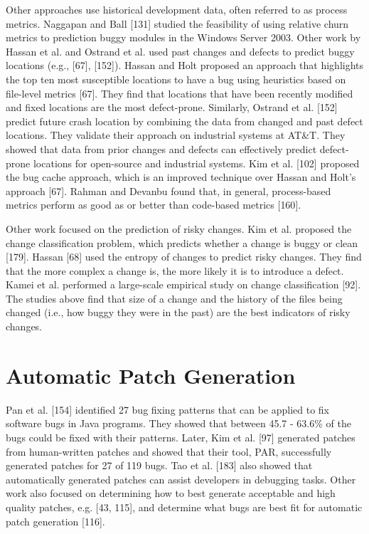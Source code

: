 \documentclass[12pt]{report}
\begin{document}
Other approaches use historical development data, often referred to as
process metrics. Naggapan and Ball {[}131{]} studied the feasibility of
using relative churn metrics to prediction buggy modules in the Windows
Server 2003. Other work by Hassan et al. and Ostrand et al. used past
changes and defects to predict buggy locations (e.g., {[}67{]},
{[}152{]}). Hassan and Holt proposed an approach that highlights the top
ten most susceptible locations to have a bug using heuristics based on
file-level metrics {[}67{]}. They find that locations that have been
recently modified and fixed locations are the most defect-prone.
Similarly, Ostrand et al. {[}152{]} predict future crash location by
combining the data from changed and past defect locations. They validate
their approach on industrial systems at AT\&T. They showed that data
from prior changes and defects can effectively predict defect-prone
locations for open-source and industrial systems. Kim et al. {[}102{]}
proposed the bug cache approach, which is an improved technique over
Hassan and Holt's approach {[}67{]}. Rahman and Devanbu found that, in
general, process-based metrics perform as good as or better than
code-based metrics {[}160{]}.

Other work focused on the prediction of risky changes. Kim et al.
proposed the change classification problem, which predicts whether a
change is buggy or clean {[}179{]}. Hassan {[}68{]} used the entropy of
changes to predict risky changes. They find that the more complex a
change is, the more likely it is to introduce a defect. Kamei et al.
performed a large-scale empirical study on change classification
{[}92{]}. The studies above find that size of a change and the history
of the files being changed (i.e., how buggy they were in the past) are
the best indicators of risky changes.

\section{Automatic Patch Generation}\label{automatic-patch-generation}

Pan et al. {[}154{]} identified 27 bug fixing patterns that can be
applied to fix software bugs in Java programs. They showed that between
45.7 - 63.6\% of the bugs could be fixed with their patterns. Later, Kim
et al. {[}97{]} generated patches from human-written patches and showed
that their tool, PAR, successfully generated patches for 27 of 119 bugs.
Tao et al. {[}183{]} also showed that automatically generated patches
can assist developers in debugging tasks. Other work also focused on
determining how to best generate acceptable and high quality patches,
e.g. {[}43, 115{]}, and determine what bugs are best fit for automatic
patch generation {[}116{]}.
\end{document}
